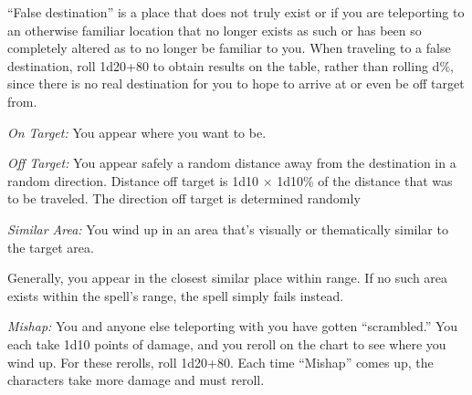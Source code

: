 {	``False destination'' is a place that does not truly exist or if you are teleporting to an otherwise familiar location that no longer exists as such or has been so completely altered as to no longer be familiar to you. When traveling to a false destination, roll 1d20+80 to obtain results on the table, rather than rolling d\%, since there is no real destination for you to hope to arrive at or even be off target from.

	\textit{On Target:}
	You appear where you want to be.

	\textit{Off Target:}
	You appear safely a random distance away from the destination in a random direction. Distance off target is 1d10 $\times$ 1d10\% of the distance that was to be traveled. The direction off target is determined randomly

	\textit{Similar Area:}
	You wind up in an area that's visually or thematically similar to the target area.

	Generally, you appear in the closest similar place within range. If no such area exists within the spell's range, the spell simply fails instead.

	\textit{Mishap:}
	You and anyone else teleporting with you have gotten ``scrambled.'' You each take 1d10 points of damage, and you reroll on the chart to see where you wind up. For these rerolls, roll 1d20+80. Each time ``Mishap'' comes up, the characters take more damage and must reroll.


}
